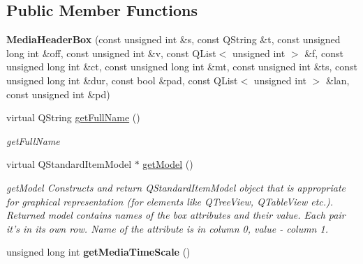 \subsection*{Public Member Functions}
\begin{DoxyCompactItemize}
\item 
\hypertarget{class_media_header_box_a97e6aa715d357b94c4ba6f7726ce2a88}{{\bfseries Media\-Header\-Box} (const unsigned int \&s, const Q\-String \&t, const unsigned long int \&off, const unsigned int \&v, const Q\-List$<$ unsigned int $>$ \&f, const unsigned long int \&ct, const unsigned long int \&mt, const unsigned int \&ts, const unsigned long int \&dur, const bool \&pad, const Q\-List$<$ unsigned int $>$ \&lan, const unsigned int \&pd)}\label{class_media_header_box_a97e6aa715d357b94c4ba6f7726ce2a88}

\item 
virtual Q\-String \hyperlink{class_media_header_box_afa8deebe50a9958932c543a79e3c198c}{get\-Full\-Name} ()
\begin{DoxyCompactList}\small\item\em get\-Full\-Name \end{DoxyCompactList}\item 
virtual Q\-Standard\-Item\-Model $\ast$ \hyperlink{class_media_header_box_a1754199a092cd0a1f0952883b119f375}{get\-Model} ()
\begin{DoxyCompactList}\small\item\em get\-Model Constructs and return Q\-Standard\-Item\-Model object that is appropriate for graphical representation (for elements like Q\-Tree\-View, Q\-Table\-View etc.). Returned model contains names of the box attributes and their value. Each pair it's in its own row. Name of the attribute is in column 0, value -\/ column 1. \end{DoxyCompactList}\item 
\hypertarget{class_media_header_box_ad3ff57e3623008c9087c266c37b27371}{unsigned long int {\bfseries get\-Media\-Time\-Scale} ()}\label{class_media_header_box_ad3ff57e3623008c9087c266c37b27371}

\end{DoxyCompactItemize}
